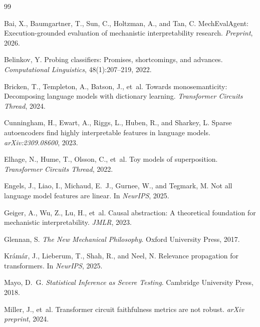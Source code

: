 \documentclass[10pt]{article}
\begin{document}
\begin{thebibliography}{99}

Bai, X., Baumgartner, T., Sun, C., Holtzman, A., and Tan, C.
\newblock MechEvalAgent: Execution-grounded evaluation of mechanistic interpretability research.
\newblock \emph{Preprint}, 2026.

Belinkov, Y.
\newblock Probing classifiers: Promises, shortcomings, and advances.
\newblock \emph{Computational Linguistics}, 48(1):207--219, 2022.

Bricken, T., Templeton, A., Batson, J., et~al.
\newblock Towards monosemanticity: Decomposing language models with dictionary learning.
\newblock \emph{Transformer Circuits Thread}, 2024.

Cunningham, H., Ewart, A., Riggs, L., Huben, R., and Sharkey, L.
\newblock Sparse autoencoders find highly interpretable features in language models.
\newblock \emph{arXiv:2309.08600}, 2023.

Elhage, N., Hume, T., Olsson, C., et~al.
\newblock Toy models of superposition.
\newblock \emph{Transformer Circuits Thread}, 2022.

Engels, J., Liao, I., Michaud, E.~J., Gurnee, W., and Tegmark, M.
\newblock Not all language model features are linear.
\newblock In \emph{NeurIPS}, 2025.

Geiger, A., Wu, Z., Lu, H., et~al.
\newblock Causal abstraction: A theoretical foundation for mechanistic interpretability.
\newblock \emph{JMLR}, 2023.

Glennan, S.
\newblock \emph{The New Mechanical Philosophy}.
\newblock Oxford University Press, 2017.

Kr{\'a}m{\'a}r, J., Lieberum, T., Shah, R., and Neel, N.
\newblock Relevance propagation for transformers.
\newblock In \emph{NeurIPS}, 2025.

Mayo, D.~G.
\newblock \emph{Statistical Inference as Severe Testing}.
\newblock Cambridge University Press, 2018.

Miller, J., et~al.
\newblock Transformer circuit faithfulness metrics are not robust.
\newblock \emph{arXiv preprint}, 2024.


\end{thebibliography}
\end{document}
